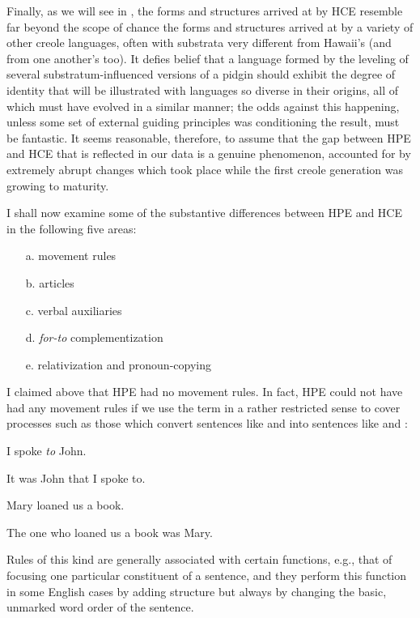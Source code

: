 Finally, as we will see in , the forms and structures arrived at by HCE resemble far beyond the scope of chance the forms
and structures arrived at by a variety of other creole languages, often with substrata very different from Hawaii's (and from one another's too). It defies belief that a language formed by the leveling of several substratum-influenced versions of a pidgin should exhibit the degree of identity that will be illustrated with languages so diverse in their origins, all of which must have evolved in a similar manner; the odds against this happening, unless some set of external guiding principles was condi\-tioning the result, must be fantastic. It seems reasonable, therefore, to assume that the gap between HPE and HCE that is reflected in our data is a genuine phenomenon, accounted for by extremely abrupt changes which took place while the first creole generation was growing to maturity.

I shall now examine some of the substantive differences between HPE and HCE in the following five areas:

\begin{enumerate}
\item[a.] movement rules
\item[b.] articles
\item[c.] verbal auxiliaries
\item[d.] \textit{for-to} complementization
\item[e.] relativization and pronoun-copying
\end{enumerate}
 
I claimed above that HPE had no movement rules. In fact, HPE could not have had any movement rules if we use the term in a rather restricted sense to cover processes such as those which convert sentences like  and  into sentences like  and :

\ea\label{ex:17}
 I spoke \textit{to} John.
\z

\ea\label{ex:18}
 It was John that I spoke to.
\glt 
\z

\ea\label{ex:19}
 Mary loaned us a book.
\glt 
\z

\ea\label{ex:20}
 The one who loaned us a book was Mary.
\glt 
\z

Rules of this kind are generally associated with certain functions, e.g.,
that of focusing one particular constituent of a sentence, and they perform this function in some English cases by adding structure but always by changing the basic, unmarked word order of the sentence.

